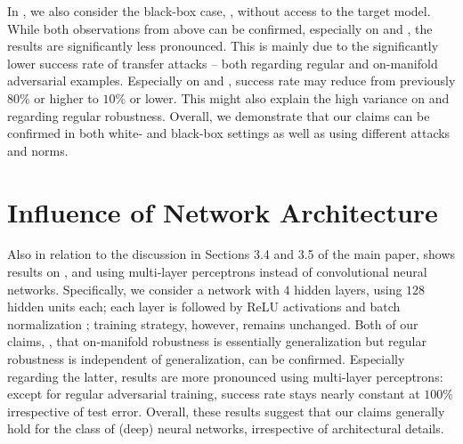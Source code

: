 \begin{appendix}
In , we also consider the black-box case, \ie, without access to the target model. While both observations from above can be confirmed, especially on \Fonts and \MNIST, the results are significantly less pronounced. This is mainly due to the significantly lower success rate of transfer attacks -- both regarding regular and on-manifold adversarial examples. Especially on \MNIST and \Fashion, success rate may reduce from previously $80\%$ or higher to $10\%$ or lower. This might also explain the high variance on \MNIST and \Fashion regarding regular robustness. Overall, we demonstrate that our claims can be confirmed in both white- and black-box settings as well as using different attacks \cite{MadryICLR2018,CarliniSP2017} and norms.

\section{Influence of Network Architecture}
\label{sec:appendix-network}

Also in relation to the discussion in Sections 3.4 and 3.5 of the main paper,  shows results on \Fonts, \MNIST and \Fashion using multi-layer perceptrons instead of convolutional neural networks. Specifically, we consider a network with $4$ hidden layers, using $128$ hidden units each; each layer is followed by ReLU activations and batch normalization \cite{IoffeICML2015}; training strategy, however, remains unchanged. Both of our claims, \ie, that on-manifold robustness is essentially generalization but regular robustness is independent of generalization, can be confirmed. Especially regarding the latter, results are more pronounced using multi-layer perceptrons: except for regular adversarial training, success rate stays nearly constant at $100\%$ irrespective of test error. Overall, these results suggest that our claims generally hold for the class of (deep) neural networks, irrespective of architectural details.



\end{appendix}
